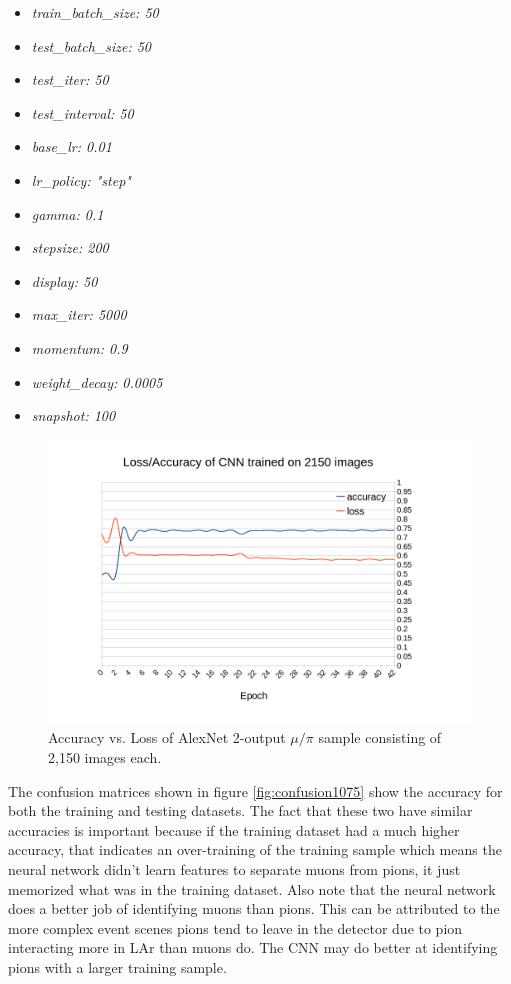 \begin{multicols}{2}
\begin{itemize}
 \item \textit{train{\_}batch{\_}size: 50}
 \item \textit{test{\_}batch{\_}size: 50}
 \item \textit{test{\_}iter: 50}
 \item \textit{test{\_}interval: 50}
 \item \textit{base{\_}lr: 0.01}
 \item \textit{lr{\_}policy: "step"}
 \item \textit{gamma: 0.1}
 \item \textit{stepsize: 200}
 \item \textit{display: 50}
 \item \textit{max{\_}iter: 5000}
 \item \textit{momentum: 0.9}
 \item \textit{weight{\_}decay: 0.0005}
 \item \textit{snapshot: 100}
\end{itemize}
\end{multicols}
\begin{figure}[htp!]
\centering
\includegraphics[width=\textwidth]{figs/acc_loss_CNN1075.png}
\caption{Accuracy vs. Loss of AlexNet 2-output $\mu/\pi$ sample consisting of 2,150 images each.} 
\label{fig:loss_accuracy_1075}
\end{figure}

The confusion matrices shown in figure \ref{fig:confusion1075} show the accuracy for both the training and testing datasets. The fact that these two have similar accuracies is important because if the training dataset had a much higher accuracy, that indicates an over-training of the training sample which means the neural network didn't learn features to separate muons from pions, it just memorized what was in the training dataset. Also note that the neural network does a better job of identifying muons than pions. This can be attributed to the more complex event scenes pions tend to leave in the detector due to pion interacting more in LAr than muons do. The CNN may do better at identifying pions with a larger training sample.


